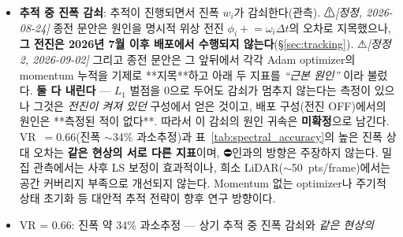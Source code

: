 \documentclass[11pt]{report}
\numberwithin{equation}{chapter}
\numberwithin{figure}{chapter}
\numberwithin{table}{chapter}
\begin{document}
\begin{itemize}
        추적 단계에서도 복원되지 않는다. 이 경우 추적 nRMSE가 초기화 직후 대비
        2--3배 높아질 수 있으며, 추적의 실질적 이점은 정확도 향상이 아닌
        계산 효율성($\sim$10 스텝 vs. $\sim$200 스텝)에 있다.
  \item \textbf{추적 중 진폭 감쇠}: 추적이 진행되면서 진폭 $w_i$가 감쇠한다(관측).
        ⚠\emph{[정정, 2026-08-24]} 종전 문안은 원인을 명시적 위상 전진
        $\phi_i \mathrel{+}= \omega_i \Delta t$의 오차로 지목했으나, \textbf{그 전진은
        2026년 7월 이후 배포에서 수행되지 않는다}(§\ref{sec:tracking}).
        ⚠\emph{[정정 2, 2026-09-02]} 그리고 종전 문안은 그 앞뒤에서 각각
        Adam optimizer의 momentum 누적을 기제로 **지목**하고 아래 두 지표를
        \emph{``근본 원인''} 이라 불렀다. \textbf{둘 다 내린다} --- $L_1$ 벌점을 $0$으로
        두어도 감쇠가 멈추지 않는다는 측정이 있으나 그것은 \emph{전진이 켜져 있던}
        구성에서 얻은 것이고, 배포 구성(전진 OFF)에서의 원인은 **측정된 적이 없다**.
        따라서 이 감쇠의 원인 귀속은 \textbf{미확정}으로 남긴다.
        VR~$= 0.66$(진폭 $\sim$34\% 과소추정)과
        표~\ref{tab:spectral_accuracy}의 높은 진폭 상대 오차는
        \textbf{같은 현상의 서로 다른 지표}이며, ⛔인과의 방향은 주장하지 않는다.
        밀집 관측에서는 사후 LS 보정이 효과적이나,
        희소 LiDAR($\sim$50~pts/frame)에서는 공간 커버리지 부족으로 개선되지 않는다.
        Momentum 없는 optimizer나 주기적 상태 초기화 등 대안적 추적 전략이 향후 연구 방향이다.
  \item VR = 0.66: 진폭 약 34\% 과소추정 --- 상기 추적 중 진폭 감쇠와 \emph{같은 현상의
}
\end{itemize}
\end{document}
